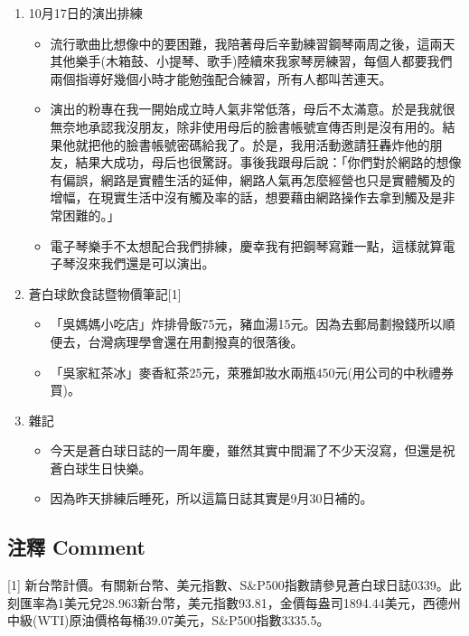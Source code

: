 \documentclass[
]{article}
\providecommand{\tightlist}{%
  \setlength{\itemsep}{0pt}\setlength{\parskip}{0pt}}
\begin{document}
\begin{enumerate}
\def\labelenumi{\arabic{enumi}.}
\item
  10月17日的演出排練

  \begin{itemize}
  \tightlist
  \item
    流行歌曲比想像中的要困難，我陪著母后辛勤練習鋼琴兩周之後，這兩天其他樂手(木箱鼓、小提琴、歌手)陸續來我家琴房練習，每個人都要我們兩個指導好幾個小時才能勉強配合練習，所有人都叫苦連天。
  \item
    演出的粉專在我一開始成立時人氣非常低落，母后不太滿意。於是我就很無奈地承認我沒朋友，除非使用母后的臉書帳號宣傳否則是沒有用的。結果他就把他的臉書帳號密碼給我了。於是，我用活動邀請狂轟炸他的朋友，結果大成功，母后也很驚訝。事後我跟母后說：「你們對於網路的想像有偏誤，網路是實體生活的延伸，網路人氣再怎麼經營也只是實體觸及的增幅，在現實生活中沒有觸及率的話，想要藉由網路操作去拿到觸及是非常困難的。」
  \item
    電子琴樂手不太想配合我們排練，慶幸我有把鋼琴寫難一點，這樣就算電子琴沒來我們還是可以演出。
  \end{itemize}
\item
  蒼白球飲食誌暨物價筆記{[}1{]}

  \begin{itemize}
  \tightlist
  \item
    「吳媽媽小吃店」炸排骨飯75元，豬血湯15元。因為去郵局劃撥錢所以順便去，台灣病理學會還在用劃撥真的很落後。
  \item
    「吳家紅茶冰」麥香紅茶25元，萊雅卸妝水兩瓶450元(用公司的中秋禮券買)。
  \end{itemize}
\item
  雜記

  \begin{itemize}
  \tightlist
  \item
    今天是蒼白球日誌的一周年慶，雖然其實中間漏了不少天沒寫，但還是祝蒼白球生日快樂。
  \item
    因為昨天排練后睡死，所以這篇日誌其實是9月30日補的。
  \end{itemize}
\end{enumerate}

\hypertarget{ux6ce8ux91cb-comment-27}{%
\subsection{注釋 Comment}\label{ux6ce8ux91cb-comment-27}}

{[}1{]}
新台幣計價。有關新台幣、美元指數、S\&P500指數請參見蒼白球日誌0339。此刻匯率為1美元兌28.963新台幣，美元指數93.81，金價每盎司1894.44美元，西德州中級(WTI)原油價格每桶39.07美元，S\&P500指數3335.5。
\end{document}
